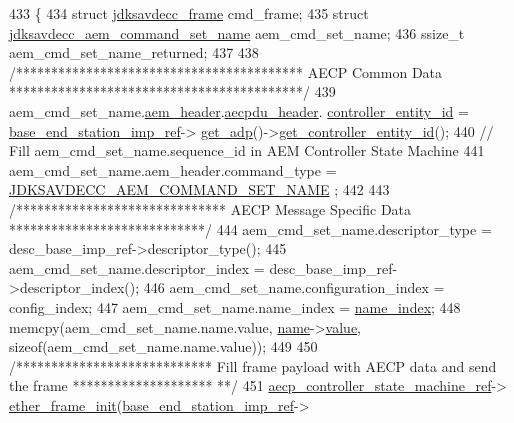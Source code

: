 \begin{DoxyCode}
433 \{
434     \textcolor{keyword}{struct }\hyperlink{structjdksavdecc__frame}{jdksavdecc\_frame} cmd\_frame;
435     \textcolor{keyword}{struct }\hyperlink{structjdksavdecc__aem__command__set__name}{jdksavdecc\_aem\_command\_set\_name} aem\_cmd\_set\_name;
436     ssize\_t aem\_cmd\_set\_name\_returned;
437 
438     \textcolor{comment}{/***************************************** AECP Common Data ******************************************/}
439     aem\_cmd\_set\_name.\hyperlink{structjdksavdecc__aem__command__set__name_ae1e77ccb75ff5021ad923221eab38294}{aem\_header}.\hyperlink{structjdksavdecc__aecpdu__aem_ae8460ae179666e7ce268ed1ef33d0de3}{aecpdu\_header}.
      \hyperlink{structjdksavdecc__aecpdu__common_affc928ddb4fc62d1d04a775d36e5f2c8}{controller\_entity\_id} = \hyperlink{classavdecc__lib_1_1descriptor__base__imp_a550c969411f5f3b69f55cc139763d224}{base\_end\_station\_imp\_ref}->
      \hyperlink{classavdecc__lib_1_1end__station__imp_a471a74540ce6182fad0c17dfd010107e}{get\_adp}()->\hyperlink{classavdecc__lib_1_1adp_a0c0959a46658c0a22e9530334b2912da}{get\_controller\_entity\_id}();
440     \textcolor{comment}{// Fill aem\_cmd\_set\_name.sequence\_id in AEM Controller State Machine}
441     aem\_cmd\_set\_name.aem\_header.command\_type = \hyperlink{group__command_ga67c447f46660cc499e4175923e99d32c}{JDKSAVDECC\_AEM\_COMMAND\_SET\_NAME}
      ;
442 
443     \textcolor{comment}{/****************************** AECP Message Specific Data ****************************/}
444     aem\_cmd\_set\_name.descriptor\_type = desc\_base\_imp\_ref->descriptor\_type();
445     aem\_cmd\_set\_name.descriptor\_index = desc\_base\_imp\_ref->descriptor\_index();
446     aem\_cmd\_set\_name.configuration\_index = config\_index;
447     aem\_cmd\_set\_name.name\_index = \hyperlink{structjdksavdecc__aem__command__set__name_a898a74ada625e0b227dadb02901404e6}{name\_index};
448     memcpy(aem\_cmd\_set\_name.name.value, \hyperlink{structjdksavdecc__aem__command__set__name_a7e615b51b7768e9b59bfa450051e0f8e}{name}->\hyperlink{structjdksavdecc__string_a7968db9d35aabae83b5c038723160e28}{value}, \textcolor{keyword}{sizeof}(aem\_cmd\_set\_name.name.value));
449 
450     \textcolor{comment}{/**************************** Fill frame payload with AECP data and send the frame ********************
      **/}
451     \hyperlink{namespaceavdecc__lib_a0b1b5aea3c0490f77cbfd9178af5be22}{aecp\_controller\_state\_machine\_ref}->
      \hyperlink{classavdecc__lib_1_1aecp__controller__state__machine_a86ff947c5e6b799cfb877d3767bfa1f9}{ether\_frame\_init}(\hyperlink{classavdecc__lib_1_1descriptor__base__imp_a550c969411f5f3b69f55cc139763d224}{base\_end\_station\_imp\_ref}->

\end{DoxyCode}
